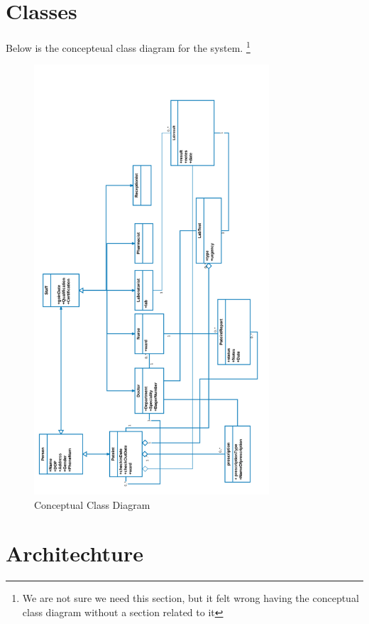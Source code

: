 \documentclass[14pt]{article}
\begin{document}
\section{Classes}
Below is the concepteual class diagram for the system.
\footnote{We are not sure we need this section, but it felt wrong having the conceptual class diagram without a section related
to it}
\begin{figure}[h!]
\centering 
  \caption{Conceptual Class Diagram}
  \includegraphics[height=16cm,keepaspectratio]{ConceptualClassDiagram.pdf}
\end{figure}
\newpage 
\section{Architechture}
\end{document}
